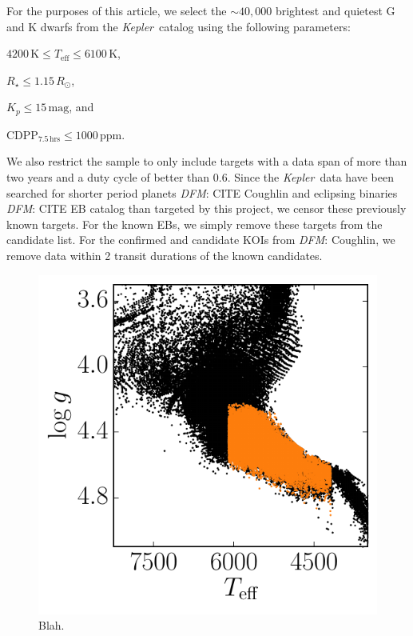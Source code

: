 \documentclass[twocolumn]{aastex6}
\newcommand{\project}[1]{\textsl{#1}}
\newcommand{\kepler}{\project{Kepler}}
\newcommand{\paper}{article}
\newcommand{\figlabel}[1]{\label{fig:#1}}
\newcommand{\todo}[3]{{\color{#2}\emph{#1}: #3}}
\newcommand{\dfmtodo}[1]{\todo{DFM}{red}{#1}}
\newcommand{\unit}[1]{{\ensuremath{\,\mathrm{#1}}}}
\begin{document}
For the purposes of this \paper, we select the $\sim40,000$ brightest and
quietest G and K dwarfs from the \kepler\ catalog using the following
parameters:
\begin{itemize}
{\item $4200\unit{K} \le T_\mathrm{eff} \le 6100\unit{K}$,}
{\item $R_\star \le 1.15\,R_\odot$,}
{\item $K_p \le 15\unit{mag}$, and}
{\item $\mathrm{CDPP}_{7.5\unit{hrs}} \le 1000\unit{ppm}$.}
\end{itemize}
We also restrict the sample to only include targets with a data span of more
than two years and a duty cycle of better than $0.6$.
Since the \kepler\ data have been searched for shorter period planets
\dfmtodo{CITE Coughlin} and eclipsing binaries \dfmtodo{CITE EB catalog} than
targeted by this project, we censor these previously known targets.
For the known EBs, we simply remove these targets from the candidate list.
For the confirmed and candidate KOIs from \dfmtodo{Coughlin}, we remove data
within 2 transit durations of the known candidates.

\begin{figure}
\begin{center}
\includegraphics{figures/targets.pdf}
\end{center}
\caption{%
Blah.
\figlabel{targets}}
\end{figure}
\end{document}
